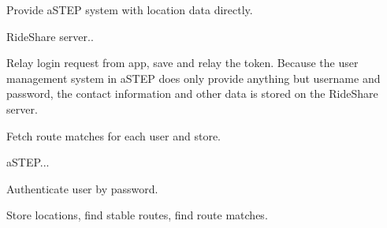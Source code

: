 Provide aSTEP system with location data directly.



RideShare server..

Relay login request from app, save and relay the token.
Because the user management system in aSTEP does only provide anything but username and password, the contact information and other data is stored on the RideShare server.


Fetch route matches for each user and store.



aSTEP...

Authenticate user by password.

Store locations, find stable routes, find route matches.
